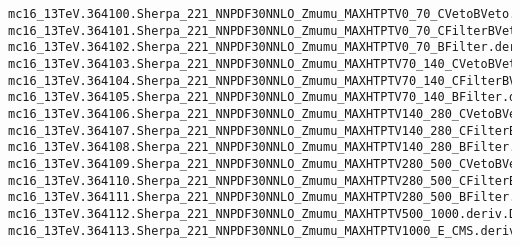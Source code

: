 \begin{tiny}
\begin{verbatim}
mc16_13TeV.364100.Sherpa_221_NNPDF30NNLO_Zmumu_MAXHTPTV0_70_CVetoBVeto.deriv.DAOD_STDM7.e5271_s3126_r10724_p4357
mc16_13TeV.364101.Sherpa_221_NNPDF30NNLO_Zmumu_MAXHTPTV0_70_CFilterBVeto.deriv.DAOD_STDM7.e5271_s3126_r10724_p4357
mc16_13TeV.364102.Sherpa_221_NNPDF30NNLO_Zmumu_MAXHTPTV0_70_BFilter.deriv.DAOD_STDM7.e5271_s3126_r10724_p4357
mc16_13TeV.364103.Sherpa_221_NNPDF30NNLO_Zmumu_MAXHTPTV70_140_CVetoBVeto.deriv.DAOD_STDM7.e5271_s3126_r10724_p4357
mc16_13TeV.364104.Sherpa_221_NNPDF30NNLO_Zmumu_MAXHTPTV70_140_CFilterBVeto.deriv.DAOD_STDM7.e5271_s3126_r10724_p4357
mc16_13TeV.364105.Sherpa_221_NNPDF30NNLO_Zmumu_MAXHTPTV70_140_BFilter.deriv.DAOD_STDM7.e5271_s3126_r10724_p4357
mc16_13TeV.364106.Sherpa_221_NNPDF30NNLO_Zmumu_MAXHTPTV140_280_CVetoBVeto.deriv.DAOD_STDM7.e5271_s3126_r10724_p4357
mc16_13TeV.364107.Sherpa_221_NNPDF30NNLO_Zmumu_MAXHTPTV140_280_CFilterBVeto.deriv.DAOD_STDM7.e5271_s3126_r10724_p4357
mc16_13TeV.364108.Sherpa_221_NNPDF30NNLO_Zmumu_MAXHTPTV140_280_BFilter.deriv.DAOD_STDM7.e5271_s3126_r10724_p4357
mc16_13TeV.364109.Sherpa_221_NNPDF30NNLO_Zmumu_MAXHTPTV280_500_CVetoBVeto.deriv.DAOD_STDM7.e5271_s3126_r10724_p4357
mc16_13TeV.364110.Sherpa_221_NNPDF30NNLO_Zmumu_MAXHTPTV280_500_CFilterBVeto.deriv.DAOD_STDM7.e5271_s3126_r10724_p4357
mc16_13TeV.364111.Sherpa_221_NNPDF30NNLO_Zmumu_MAXHTPTV280_500_BFilter.deriv.DAOD_STDM7.e5271_s3126_r10724_p4357
mc16_13TeV.364112.Sherpa_221_NNPDF30NNLO_Zmumu_MAXHTPTV500_1000.deriv.DAOD_STDM7.e5271_s3126_r10724_p4357
mc16_13TeV.364113.Sherpa_221_NNPDF30NNLO_Zmumu_MAXHTPTV1000_E_CMS.deriv.DAOD_STDM7.e5271_s3126_r10724_p4357
\end{verbatim}
\end{tiny}
